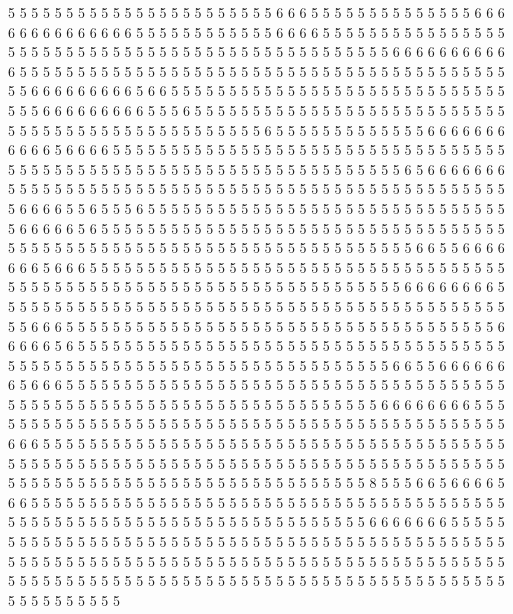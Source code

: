 5 5 5 5 5 5 5 5 5 5 5 5 5 5 5 5 5 5 5 5
5 5 5 6 6 6 5 5 5 5 5 5 5 5 5 5 5 5 5 5
6 6 6 6 6 6 6 6 6 6 6 6 6 6 5 5 5 5 5 5
5 5 5 5 5 5 6 6 6 6 5 5 5 5 5 5 5 5 5 5
5 5 5 5 5 5 5 5 5 5 5 5 5 5 5 5 5 5 5 5
5 5 5 5 5 5 5 5 5 5 5 5 5 5 5 5 5 5 5 6
6 6 6 6 6 6 6 6 6 6 5 5 5 5 5 5 5 5 5 5
5 5 5 5 5 5 5 5 5 5 5 5 5 5 5 5 5 5 5 5
5 5 5 5 5 5 5 5 5 5 5 5 5 5 6 6 6 6 6 6
6 6 6 5 6 6 5 5 5 5 5 5 5 5 5 5 5 5 5 5
5 5 5 5 5 5 5 5 5 5 5 5 5 5 5 5 5 5 6 6
6 6 6 6 6 6 6 5 5 5 6 5 5 5 5 5 5 5 5 5
5 5 5 5 5 5 5 5 5 5 5 5 5 5 5 5 5 5 5 5
5 5 5 5 5 5 5 5 5 5 5 5 5 5 5 5 5 5 5 5
6 5 5 5 5 5 5 5 5 5 5 5 5 5 6 6 6 6 6 6
6 6 6 6 6 5 6 6 6 6 5 5 5 5 5 5 5 5 5 5
5 5 5 5 5 5 5 5 5 5 5 5 5 5 5 5 5 5 5 5
5 5 5 5 5 5 5 5 5 5 5 5 5 5 5 5 5 5 5 5
5 5 5 5 5 5 5 5 5 5 5 5 5 5 5 5 5 5 6 5
6 6 6 6 6 6 6 5 5 5 5 5 5 5 5 5 5 5 5 5
5 5 5 5 5 5 5 5 5 5 5 5 5 5 5 5 5 5 5 5
5 5 5 5 5 5 5 5 5 5 5 6 6 6 6 5 5 6 5 5
5 6 5 5 5 5 5 5 5 5 5 5 5 5 5 5 5 5 5 5
5 5 5 5 5 5 5 5 5 5 5 5 5 5 6 6 6 6 6 5
6 5 5 5 5 5 5 5 5 5 5 5 5 5 5 5 5 5 5 5
5 5 5 5 5 5 5 5 5 5 5 5 5 5 5 5 5 5 5 5
5 5 5 5 5 5 5 5 5 5 5 5 5 5 5 5 5 5 5 5
5 5 5 5 5 5 5 5 5 5 5 6 6 5 5 6 6 6 6 6
6 6 5 6 6 6 5 5 5 5 5 5 5 5 5 5 5 5 5 5
5 5 5 5 5 5 5 5 5 5 5 5 5 5 5 5 5 5 5 5
5 5 5 5 5 5 5 5 5 5 5 5 5 5 5 5 5 5 5 5
5 5 5 5 5 5 5 5 5 5 5 5 5 5 5 5 6 6 6 6
6 6 6 6 5 5 5 5 5 5 5 5 5 5 5 5 5 5 5 5
5 5 5 5 5 5 5 5 5 5 5 5 5 5 5 5 5 5 5 5
5 5 5 5 5 5 5 5 5 5 6 6 6 5 5 5 5 5 5 5
5 5 5 5 5 5 5 5 5 5 5 5 5 5 5 5 5 5 5 5
5 5 5 5 5 5 5 5 5 5 6 6 6 6 6 5 6 5 5 5
5 5 5 5 5 5 5 5 5 5 5 5 5 5 5 5 5 5 5 5
5 5 5 5 5 5 5 5 5 5 5 5 5 5 5 5 5 5 5 5
5 5 5 5 5 5 5 5 5 5 5 5 5 5 5 5 5 5 5 5
5 5 5 5 5 5 5 6 6 5 5 6 6 6 6 6 6 6 5 6
6 6 5 5 5 5 5 5 5 5 5 5 5 5 5 5 5 5 5 5
5 5 5 5 5 5 5 5 5 5 5 5 5 5 5 5 5 5 5 5
5 5 5 5 5 5 5 5 5 5 5 5 5 5 5 5 5 5 5 5
5 5 5 5 5 5 5 5 5 5 5 5 6 6 6 6 6 6 6 6
5 5 5 5 5 5 5 5 5 5 5 5 5 5 5 5 5 5 5 5
5 5 5 5 5 5 5 5 5 5 5 5 5 5 5 5 5 5 5 5
5 5 5 5 5 5 6 6 6 5 5 5 5 5 5 5 5 5 5 5
5 5 5 5 5 5 5 5 5 5 5 5 5 5 5 5 5 5 5 5
5 5 5 5 5 5 5 5 5 5 5 5 5 5 5 5 5 5 5 5
5 5 5 5 5 5 5 5 5 5 5 5 5 5 5 5 5 5 5 5
5 5 5 5 5 5 5 5 5 5 5 5 5 5 5 5 5 5 5 5
5 5 5 5 5 5 5 5 5 5 5 5 5 5 5 5 5 5 5 5
5 5 5 8 5 5 5 6 6 5 6 6 6 6 5 6 6 5 5 5
5 5 5 5 5 5 5 5 5 5 5 5 5 5 5 5 5 5 5 5
5 5 5 5 5 5 5 5 5 5 5 5 5 5 5 5 5 5 5 5
5 5 5 5 5 5 5 5 5 5 5 5 5 5 5 5 5 5 5 5
5 5 5 5 5 5 5 5 5 6 6 6 6 6 6 6 5 5 5 5
5 5 5 5 5 5 5 5 5 5 5 5 5 5 5 5 5 5 5 5
5 5 5 5 5 5 5 5 5 5 5 5 5 5 5 5 5 5 5 5
5 5 5 5 5 5 5 5 5 5 5 5 5 5 5 5 5 5 5 5
5 5 5 5 5 5 5 5 5 5 5 5 5 5 5 5 5 5 5 5
5 5 5 5 5 5 5 5 5 5 5 5 5 5 5 5 5 5 5 5
5 5 5 5 5 5 5 5 5 5 5 5 5 5 5 5 5 5 5 5
5 5 5 5 5 5 5 5 5 5 5 5 5 5 5 5 5 5 5 5
